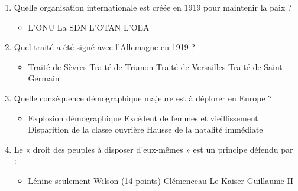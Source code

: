 \documentclass[11pt]{article}
\begin{document}
\begin{exercice}
\begin{enumerate}
    \item Quelle organisation internationale est créée en 1919 pour maintenir la paix ?
    \begin{itemize}
        \item[A.] L'ONU \quad [B.] La SDN \quad [C.] L'OTAN \quad [D.] L'OEA
    \end{itemize}
    \item Quel traité a été signé avec l'Allemagne en 1919 ?
    \begin{itemize}
        \item[A.] Traité de Sèvres \quad [B.] Traité de Trianon \quad [C.] Traité de Versailles \quad [D.] Traité de Saint-Germain
    \end{itemize}
    \item Quelle conséquence démographique majeure est à déplorer en Europe ?
    \begin{itemize}
        \item[A.] Explosion démographique \quad [B.] Excédent de femmes et vieillissement \quad [C.] Disparition de la classe ouvrière \quad [D.] Hausse de la natalité immédiate
    \end{itemize}
    \item Le « droit des peuples à disposer d'eux-mêmes » est un principe défendu par :
    \begin{itemize}
        \item[A.] Lénine seulement \quad [B.] Wilson (14 points) \quad [C.] Clémenceau \quad [D.] Le Kaiser Guillaume II
    \end{itemize}
\end{enumerate}
\end{exercice}
\end{document}
